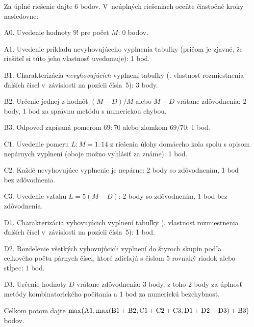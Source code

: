 {\schemaABC
Za úplné riešenie dajte 6 bodov. V~neúplných riešeniach oceňte
čiastočné kroky nasledovne:
\item{A0.} Uvedenie hodnoty $9!$ pre počet $M$: 0 bodov.
\item{A1.} Uvedenie príkladu nevyhovujúceho vyplnenia tabuľky (pričom je zjavné, že riešiteľ si túto jeho vlastnosť uvedomuje): 1 bod.
\item{B1.} Charakterizácia \emph{nevyhovujúcich} vyplnení tabuľky (\tj. vlastnosť rozmiestnenia ďalších čísel v~závislosti na pozícii čísla~5): 3 body.
\item{B2.} Určenie jednej z hodnôt $(M-D)/M$ alebo $M-D$ vrátane zdôvodnenia: 2 body, 1 bod za správnu metódu s numerickou chybou.
\item{B3.} Odpoveď zapísaná pomerom $69:70$ alebo zlomkom $69/70$: 1 bod.
\item{C1.} Uvedenie pomeru $L:M=1:14$ z riešenia úlohy domáceho kola spolu s opisom nepárnych vyplnení (oboje možno vyhlásiť za známe): 1 bod.
\item{C2.} Každé nevyhovujúce vyplnenie je nepárne: 2 body so zdôvodnením, 1 bod bez zdôvodnenia.
\item{C3.} Uvedenie vzťahu $L=5(M-D)$: 2 body so zdôvodnením, 1 bod bez zdôvodnenia.
\item{D1.} Charakterizácia vyhovujúcich vyplnení tabuľky (\tj. vlastnosť rozmiestnenia ďalších čísel v~závislosti na pozícii čísla~5): 1 bod.
\item{D2.} Rozdelenie všetkých vyhovujúcich vyplnení do štyroch skupín podľa celkového počtu párnych čísel, ktoré zdieľajú s číslom 5 rovnaký riadok alebo stĺpec: 1 bod.
\item{D3.} Určenie hodnoty $D$ vrátane zdôvodnenia: 3 body, z toho 2 body za úplnosť metódy kombinatorického počítania a 1 bod za numerickú bezchybnosť.

\noindent
Celkom potom dajte $\rm\max\bigl(A1,\max(B1+B2,C1+C2+C3,D1+D2+D3)+B3\bigr)$ bodov.
\endschema
}

